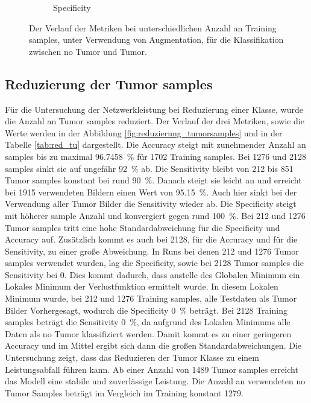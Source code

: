 \begin{figure}[H]
\begin{subfigure}[b]{0.48\textwidth}
    \caption{Specificity}
    \label{fig:augmentation_specificity}
  \end{subfigure}
  \caption{Der Verlauf der Metriken bei unterschiedlichen Anzahl an Training samples, unter Verwendung von Augmentation, für die Klassifikation zwischen no Tumor und Tumor.}
  \label{fig:augmentation_tu}
\end{figure}

\subsection{Reduzierung der Tumor samples}
Für die Untersuchung der Netzwerkleistung bei Reduzierung einer Klasse, wurde die Anzahl an Tumor samples reduziert.
Der Verlauf der drei Metriken, sowie die Werte werden in der Abbildung \ref{fig:reduzierung_tumorsamples} und in der Tabelle \ref{tab:red_tu} dargestellt.
Die Accuracy steigt mit zunehmender Anzahl an samples bis zu maximal \SI{96.7458}{\percent} für 1702 Training samples.
Bei 1276 und 2128 samples sinkt sie auf ungefähr \SI{92}{\percent} ab. 
Die Sensitivity bleibt von 212 bis 851 Tumor samples konstant bei rund \SI{90}{\%}.
Danach steigt sie leicht an und erreicht bei 1915 verwendeten Bildern einen Wert von \SI{95.15}{\%}.
Auch hier sinkt bei der Verwendung aller Tumor Bilder die Sensitivity wieder ab.
Die Specificity steigt mit höherer sample Anzahl und konvergiert gegen rund \SI{100}{\%}.
Bei 212 und 1276 Tumor samples tritt eine hohe Standardabweichung für die Specificity und Accuracy auf.
Zusätzlich kommt es auch bei 2128, für die Accuracy und für die Sensitivity, zu einer große Abweichung. 
In Runs bei denen 212 und 1276 Tumor samples verwendet wurden, lag die Specificity, 
sowie bei 2128 Tumor samples die Sensitivity bei 0.
Dies kommt dadurch, dass anstelle des Globalen Minimum ein Lokales Minimum der Verlustfunktion ermittelt wurde.
In diesem Lokalen Minimum wurde, bei 212 und 1276 Training samples, alle Testdaten als Tumor Bilder Vorhergesagt, wodurch die Specificity \SI{0}{\%} beträgt.
Bei 2128 Training samples beträgt die Sensitivity \SI{0}{\%}, da aufgrund des Lokalen Minimums alle Daten als no Tumor klassifiziert werden.
Damit kommt es zu einer geringeren Accuracy und im Mittel ergibt sich dann die großen Standardabweichungen.
Die Untersuchung zeigt, dass das Reduzieren der Tumor Klasse zu einem Leistungsabfall führen kann.
Ab einer Anzahl von 1489 Tumor samples erreicht das Modell eine stabile und zuverlässige Leistung.
Die Anzahl an verwendeten no Tumor Samples beträgt im Vergleich im Training konstant 1279. 
